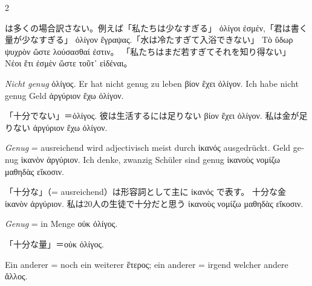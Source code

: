 \begin{paracol}{2}
\begin{enumerate}[leftmargin=0pt,rightmargin=0pt,listparindent =1cm,labelindent=1cm,labelsep=1ex,labelwidth={*},itemindent={*},align=left]
\begin{japanese}
 は多くの場合訳さない。例えば「私たちは少なすぎる」
\textgreek[variant=ancient]{ὀλίγοι ἐσμέν,}「君は書く量が少なすぎる」
\textgreek[variant=ancient]{ὀλίγον ἔγραψας.}「水は冷たすぎて入浴できない」
\textgreek[variant=ancient]{Τὸ ὕδωρ ψυχρὸν ὥστε λούσασθαί ἐστιν}。
「私たちはまだ若すぎてそれを知り得ない」
\textgreek[variant=ancient]{Νέοι ἔτι ἐσμὲν ὥστε τοῦτ᾽ εἰδέναι}。
\end{japanese}
\switchcolumn*

\begin{german}
\emph{Nicht genug} \textgreek[variant=ancient]{ὀλίγος.} Er hat nicht
genug zu leben \textgreek[variant=ancient]{βίον ἔχει ὀλίγον.} Ich
habe nicht genug Geld \textgreek[variant=ancient]{ἀργύριον ἔχω ὀλίγον.}
\end{german}
\switchcolumn

\begin{japanese}
「十分でない」＝\textgreek[variant=ancient]{ὀλίγος.}
彼は生活するには足りない \textgreek[variant=ancient]{βίον ἔχει ὀλίγον.}
私は金が足りない \textgreek[variant=ancient]{ἀργύριον ἔχω ὀλίγον.}
\end{japanese}
\switchcolumn*

\begin{german}
\emph{Genug} = ausreichend wird adjectivisch meist durch \textgreek[variant=ancient]{ἱκανός}
ausgedrückt. Geld genug \textgreek[variant=ancient]{ἱκανὸν ἀργύριον.}
Ich denke, zwanzig Schüler sind genug \textgreek[variant=ancient]{ἱκανοὺς
νομίζω μαθηδὰς εἴκοσιν.}
\end{german}
\switchcolumn

\begin{japanese}
「十分な」（= ausreichend）は形容詞として主に \textgreek[variant=ancient]{ἱκανός} で表す。
十分な金 \textgreek[variant=ancient]{ἱκανὸν ἀργύριον.}
私は20人の生徒で十分だと思う \textgreek[variant=ancient]{ἱκανοὺς νομίζω μαθηδὰς εἴκοσιν.}
\end{japanese}
\switchcolumn*

\begin{german}
\emph{Genug} = in Menge \textgreek[variant=ancient]{οὐκ ὀλίγος.}
\end{german}
\switchcolumn

\begin{japanese}
「十分な量」＝\textgreek[variant=ancient]{οὐκ ὀλίγος.}
\end{japanese}
\switchcolumn*

\begin{german}
\item Ein anderer = noch ein weiterer \textgreek[variant=ancient]{ἕτερος;
}ein anderer = irgend welcher andere \textgreek[variant=ancient]{ἄλλος.}
\end{german}
\switchcolumn


\end{enumerate}
\end{paracol}
